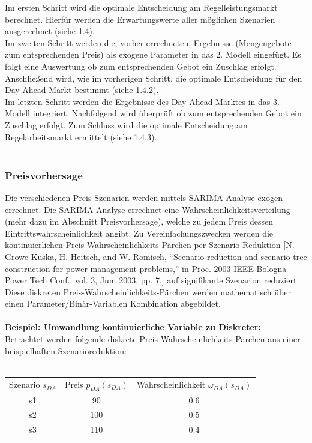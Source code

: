 \documentclass{article}
\begin{document}
Im ersten Schritt wird die optimale Entscheidung am Regelleistungsmarkt berechnet. Hierfür werden die Erwartungswerte aller möglichen Szenarien ausgerechnet (siehe 1.4).\\

Im zweiten Schritt werden die, vorher errechneten, Ergebnisse (Mengengebote zum entsprechenden Preis) als exogene Parameter in das 2. Modell eingefügt. Es folgt eine Auswertung ob zum entsprechenden Gebot ein Zuschlag erfolgt. Anschließend wird, wie im vorherigen Schritt, die optimale Entscheidung für den Day Ahead Markt bestimmt (siehe 1.4.2).\\

Im letzten Schritt werden die Ergebnisse des Day Ahead Marktes in das 3. Modell integriert. Nachfolgend wird überprüft ob zum entsprechenden Gebot ein Zuschlag erfolgt. Zum Schluss wird die optimale Entscheidung am Regelarbeitsmarkt ermittelt (siehe 1.4.3).\\
\\





\subsubsection{Preisvorhersage}
Die verschiedenen Preis Szenarien werden mittels SARIMA Analyse exogen errechnet. Die SARIMA Analyse errechnet eine Wahrscheinlichkeitsverteilung (mehr dazu im Abschnitt Preisvorhersage), welche zu jedem Preis dessen Eintrittswahrscheinlichkeit angibt. Zu Vereinfachungszwecken werden die kontinuierlichen Preis-Wahrscheinlichkeits-Pärchen per Szenario Reduktion [N. Growe-Kuska, H. Heitsch, and W. Romisch, “Scenario reduction and scenario tree construction for power management problems,” in Proc.
2003 IEEE Bologna Power Tech Conf., vol. 3, Jun. 2003, pp. 7.] auf signifikante Szenarion reduziert.
Diese diskreten Preis-Wahrscheinlichkeits-Pärchen werden mathematisch über einen Parameter/Binär-Variablen Kombination abgebildet.\\
\\
\textbf{Beispiel: Umwandlung kontinuierliche Variable zu Diskreter:}
\\
Betrachtet werden folgende diskrete Preis-Wahrscheinlichkeits-Pärchen aus einer beispielhaften Szenarioreduktion:\\
\\
\begin{tabular}{c|c|c}
     Szenario $s_{DA}$& Preis $p_{DA}(s_{DA})$ & Wahrscheinlichkeit $\omega_{DA}(s_{DA})$ \\
     s1       & 90 & 0.6 \\
     s2       & 100 & 0.5 \\
     s3       & 110 & 0.4 \\
\end{tabular}\\
\\
\end{document}
